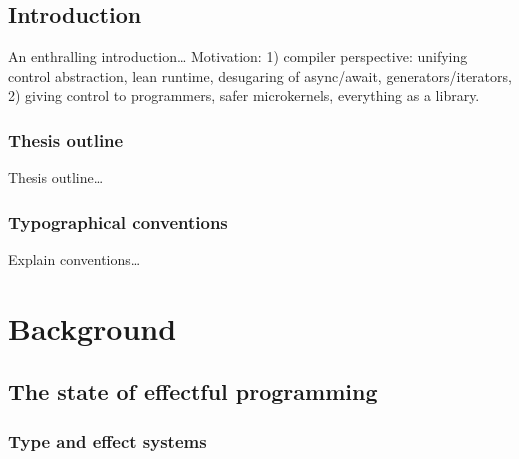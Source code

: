 \documentclass[12pt,phd,lfcs,twoside,openright,logo,leftchapter,normalheadings]{infthesis}
\theoremstyle{plain}
\theoremstyle{definition}
\begin{document}
\begin{preliminary}
\dedication{\emph{To be or to do}}


\setcounter{secnumdepth}{2} %
\setcounter{tocdepth}{1} %
\tableofcontents

\end{preliminary}


\chapter{Introduction}
\label{ch:introduction}
An enthralling introduction\dots
%
Motivation: 1) compiler perspective: unifying control abstraction,
lean runtime, desugaring of async/await, generators/iterators, 2)
giving control to programmers, safer microkernels, everything as a
library.

\section{Thesis outline}
Thesis outline\dots

\section{Typographical conventions}
Explain conventions\dots

\part{Background}
\label{p:background}

\chapter{The state of effectful programming}
\label{ch:related-work}

\section{Type and effect systems}
\end{document}
